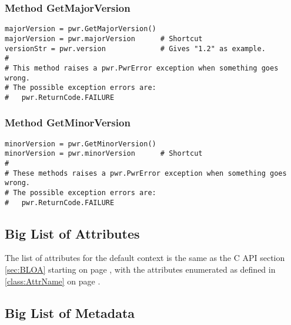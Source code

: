 \documentclass[12pt]{report} %
\begin{document}
\begin{appendices}
\subsubsection{Method GetMajorVersion} \label{meth:GetMajorVersion}

\begin{center}\begin{minipage}{.95\linewidth}\begin{lstlisting}
majorVersion = pwr.GetMajorVersion()
majorVersion = pwr.majorVersion      # Shortcut
versionStr = pwr.version             # Gives "1.2" as example.
#
# This method raises a pwr.PwrError exception when something goes wrong.
# The possible exception errors are:
#   pwr.ReturnCode.FAILURE
\end{lstlisting}\end{minipage}\end{center}

\subsubsection{Method GetMinorVersion} \label{meth:GetMinorVersion}

\begin{center}\begin{minipage}{.95\linewidth}\begin{lstlisting}
minorVersion = pwr.GetMinorVersion()
minorVersion = pwr.minorVersion      # Shortcut
#
# These methods raises a pwr.PwrError exception when something goes wrong.
# The possible exception errors are:
#   pwr.ReturnCode.FAILURE
\end{lstlisting}\end{minipage}\end{center}

\subsection{Big List of Attributes} \label{sec:PythonBigListOfAttributes}

The list of attributes for the default context is the same as the C API section
\ref{sec:BLOA} starting on page \pageref{sec:BLOA}, with the attributes
enumerated as defined in \ref{class:AttrName} on page \pageref{class:AttrName}.

\subsection{Big List of Metadata} \label{sec:PythonBigListOfMetadata}


\end{appendices}
\end{document}
